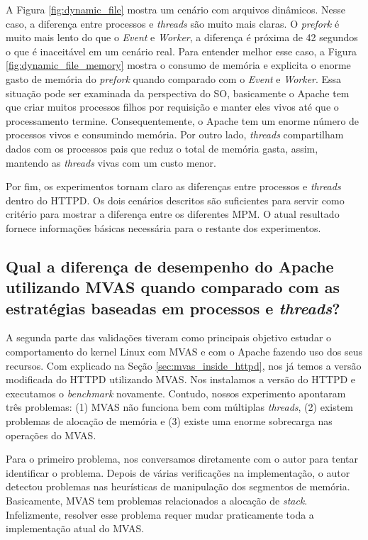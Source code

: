 A Figura \ref{fig:dynamic_file} mostra um cenário com arquivos dinâmicos. Nesse
caso, a diferença entre processos e \emph{threads} são muito mais claras. O
\emph{prefork} é muito mais lento do que o \emph{Event} e \emph{Worker}, a
diferença é próxima de 42 segundos o que é inaceitável em um cenário real.
Para entender melhor esse caso, a Figura \ref{fig:dynamic_file_memory} mostra o
consumo de memória e explicita o enorme gasto de memória do \emph{prefork}
quando comparado com o \emph{Event} e \emph{Worker}. Essa situação pode ser
examinada da perspectiva do SO, basicamente o Apache tem que criar muitos
processos filhos por requisição e manter eles vivos até que o processamento
termine. Consequentemente, o Apache tem um enorme número de processos vivos e
consumindo memória. Por outro lado, \emph{threads} compartilham dados com os
processos pais que reduz o total de memória gasta, assim, mantendo as
\emph{threads} vivas com um custo menor.

Por fim, os experimentos tornam claro as diferenças entre processos e
\emph{threads} dentro do HTTPD. Os dois cenários descritos são suficientes para
servir como critério para mostrar a diferença entre os diferentes MPM. O atual
resultado fornece informações básicas necessária para o restante dos
experimentos.

\subsection{Qual a diferença de desempenho do Apache utilizando MVAS quando comparado com as estratégias baseadas em processos e \emph{threads}?}

A segunda parte das validações tiveram como principais objetivo estudar o
comportamento do kernel Linux com MVAS e com o Apache fazendo uso dos seus
recursos. Com explicado na Seção \ref{sec:mvas_inside_httpd}, nos já temos a
versão modificada do HTTPD utilizando MVAS. Nos instalamos a versão do HTTPD e
executamos o \emph{benchmark} novamente. Contudo, nossos experimento apontaram
três problemas: (1) MVAS não funciona bem com múltiplas \emph{threads}, (2)
existem problemas de alocação de memória e (3) existe uma enorme sobrecarga nas
operações do MVAS.

Para o primeiro problema, nos conversamos diretamente com o autor para tentar
identificar o problema. Depois de várias verificações na implementação, o autor
detectou problemas nas heurísticas de manipulação dos segmentos de memória.
Basicamente, MVAS tem problemas relacionados a alocação de \emph{stack}.
Infelizmente, resolver esse problema requer mudar praticamente toda a
implementação atual do MVAS.

